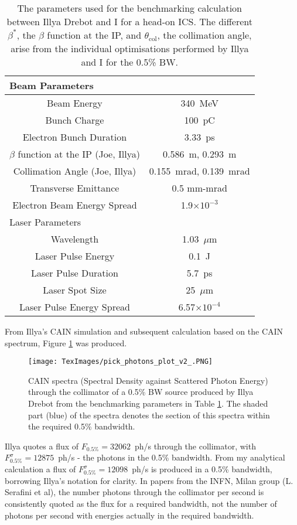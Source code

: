 \documentclass[10pt]{article}
\begin{document}
\begin{table}[H]
\centering
\begin{tabular}{cc}
\hline
\hline
\multicolumn{2}{l}{Beam Parameters} \\
\hline
Beam Energy & 340~MeV \\
Bunch Charge & 100~pC \\
Electron Bunch Duration & 3.33~ps \\
$\beta$ function at the IP (Joe, Illya) & 0.586~m, 0.293~m \\
Collimation Angle (Joe, Illya) & 0.155~mrad, 0.139~mrad \\
Transverse Emittance & 0.5 mm-mrad \\
Electron Beam Energy Spread & 1.9$\times 10^{-3}$ \\
\hline
\multicolumn{2}{l}{Laser Parameters} \\
\hline
Wavelength & 1.03~$\mu$m \\
Laser Pulse Energy & 0.1~J \\
Laser Pulse Duration & 5.7~ps \\
Laser Spot Size & 25~$\mu$m \\
Laser Pulse Energy Spread & 6.57$\times 10^{-4}$ \\
\hline
\hline
\end{tabular}
\caption{The parameters used for the benchmarking calculation between Illya Drebot and I for a head-on ICS. The different $\beta^{*}$, the $\beta$ function at the IP, and $\theta_{\mathrm{col}}$, the collimation angle, arise from the individual optimisations performed by Illya and I for the 0.5\% BW.} 
\label{tab:illyameparam}
\end{table}   
   
From Illya's CAIN simulation and subsequent calculation based on the CAIN spectrum, Figure \ref{fig:illyaplot} was produced.

\begin{figure}[H]
\centering
\texttt{[image: TexImages/pick\_photons\_plot\_v2\_.PNG]}
\caption{CAIN spectra (Spectral Density against Scattered Photon Energy) through the collimator of a 0.5\% BW source produced by Illya Drebot from the benchmarking parameters in Table \ref{tab:illyameparam}. The shaded part (blue) of the spectra denotes the section of this spectra within the required 0.5\% bandwidth.}
\label{fig:illyaplot}
\end{figure}

Illya quotes a flux of $F_{0.5\%} = 32062$~ph/s through the collimator, with $F_{0.5\%}^{\sigma} = 12875$~ph/s - the photons in the 0.5\% bandwidth. From my analytical calculation a flux of $F^{\sigma}_{0.5\%} = 12098$~ph/s is produced in a 0.5\% bandwidth, borrowing Illya's notation for clarity. In papers from the INFN, Milan group (L. Serafini et al), the number photons through the collimator per second is consistently quoted as the flux for a required bandwidth, not the number of photons per second with energies actually in the required bandwidth.
\end{document}
